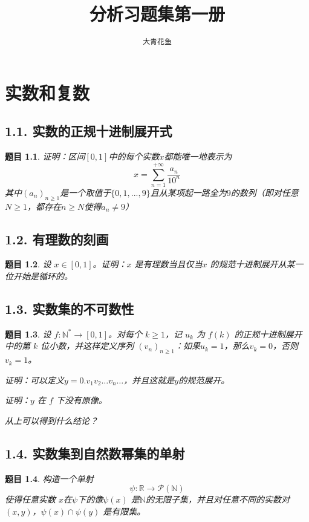 \documentclass[12pt,UTF8]{ctexbook}
\title{\zihao{0} \bfseries 分析习题集第一册}
\author{\zihao{2} \texttt{大青花鱼}}
\date{}
\theoremstyle{exercisestyle}
\newtheorem*{exercise}{题目}
\theoremstyle{solutionstyle}
\begin{document}
\maketitle
\tableofcontents
\newpage

\chapter{实数和复数}
\section{1.1. 实数的正规十进制展开式}
\begin{exercise}
证明：区间$[0,1]$中的每个实数$x$都能唯一地表示为
$$x = \sum_{n=1}^{+\infty} \frac{a_n}{10^n}$$
其中$(a_n)_{n \geq 1}$是一个取值于$\{0,1,...,9\}$且从某项起一路全为$9$的数列（即对任意$N \ge 1$，都存在$n \ge N$使得$a_n \ne 9$）
\end{exercise}

\section{1.2. 有理数的刻画}\label{caractérisation-des-rationnels}
\begin{exercise}
设 $x \in [0,1]$。证明：$x$ 是有理数当且仅当$x$ 的规范十进制展开从某一位开始是循环的。  

\end{exercise}

\section{1.3. 实数集的不可数性}\label{non-dénombrabilité-de-r}
\begin{exercise}
设 $f: \mathbb{N}^* \to [0,1]$。对每个 $k \geq 1$，记 $u_k$ 为 $f(k)$ 的正规十进制展开中的第 $k$ 位小数，并这样定义序列 $(v_n)_{n\geq 1}$：如果$u_k = 1$，那么$v_k = 0$，否则 $v_k = 1$。
\begin{subquestions}
\item 证明：可以定义$y = 0.v_1 v_2 \ldots v_n \ldots$，并且这就是$y$的规范展开。
\item 证明：$y$ 在 $f$ 下没有原像。
\item 从上可以得到什么结论？
\end{subquestions}
\end{exercise}

\section{1.4. 实数集到自然数幂集的单射}
\begin{exercise}
构造一个单射
$$
\psi : \mathbb{R} \to \mathcal{P}(\mathbb{N})
$$
使得任意实数 $x$在$\psi$下的像$\psi(x)$ 是$\mathbb{N}$的无限子集，并且对任意不同的实数对 $(x, y)$，$\psi(x) \cap \psi(y)$ 是有限集。

\end{exercise}
\end{document}
